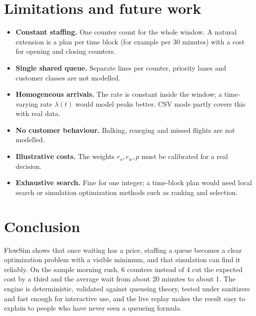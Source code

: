 \documentclass[11pt,a4paper]{article}
\begin{document}
\section{Limitations and future work}
\begin{itemize}
  \item \textbf{Constant staffing.} One counter count for the whole window. A natural extension is a plan per time
    block (for example per 30 minutes) with a cost for opening and closing counters.
  \item \textbf{Single shared queue.} Separate lines per counter, priority lanes and customer classes are not modelled.
  \item \textbf{Homogeneous arrivals.} The rate is constant inside the window; a time-varying rate $\lambda(t)$ would model
    peaks better. CSV mode partly covers this with real data.
  \item \textbf{No customer behaviour.} Balking, reneging and missed flights are not modelled.
  \item \textbf{Illustrative costs.} The weights $r_s, r_w, p$ must be calibrated for a real decision.
  \item \textbf{Exhaustive search.} Fine for one integer; a time-block plan would need local search or simulation
    optimization methods such as ranking and selection.
\end{itemize}

\section{Conclusion}
FlowSim shows that once waiting has a price, staffing a queue becomes a clear optimization problem with a visible
minimum, and that simulation can find it reliably. On the sample morning rush, 6 counters instead of 4 cut the expected
cost by a third and the average wait from about 20 minutes to about 1. The engine is deterministic, validated against
queueing theory, tested under sanitizers and fast enough for interactive use, and the live replay makes the result easy
to explain to people who have never seen a queueing formula.
\end{document}
